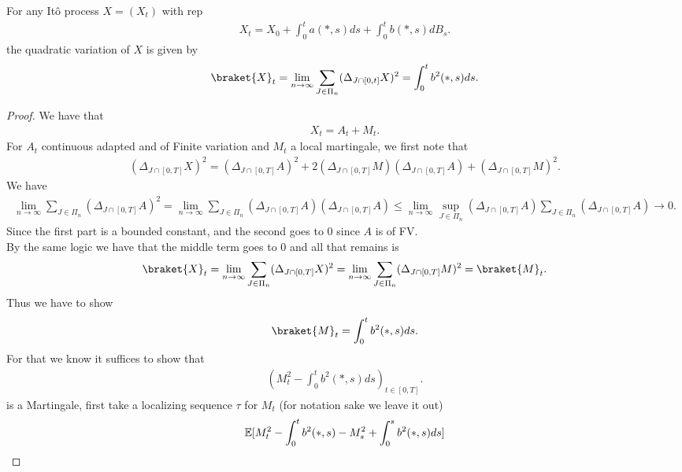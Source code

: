 \begin{Prop}[4.3]
  For any It\^o process $X = (X_t)$ with rep
  \begin{align*}
    X_t = X_{0} + \int_0^{t} a(*,s) ds + \int_0^{t} b(*,s) dB_s
  .\end{align*}
 the quadratic variation of $X$ is given by 
 \begin{align*}
   \braket{X}_t = \lim_{n\to \infty} \sum_{J \in  \Pi_n}(\Delta_{J \cap [0,t]} X)^2 = \int_0^{t} b^2(*,s)  ds
 .\end{align*}
\end{Prop}
\begin{proof}
 We have that 
 \begin{align*}
  X_t = A_t + M_t
 .\end{align*}
 For $A_t$ continuous adapted and of Finite variation and $M_t$ a local martingale,
 we first note that 
 \begin{align*}
  (\Delta_{J \cap [0,T]} X)^2 =   (\Delta_{J \cap [0,T]} A)^2 + 2(\Delta_{J \cap [0,T]} M)(\Delta_{J \cap [0,T]} A) + (\Delta_{J \cap [0,T]} M)^2
 .\end{align*}
 We have 
 \begin{align*}
   \lim_{n\to \infty}\sum_{J \in  \Pi_n} (\Delta_{J \cap [0,T]} A)^2  = \lim_{n\to \infty}\sum_{J \in  \Pi_n} (\Delta_{J \cap [0,T]} A) (\Delta_{J \cap [0,T]} A) \le  \lim_{n\to \infty}  \sup_{J \in  \Pi_n} (\Delta_{J \cap [0,T]} A) \sum_{J \in  \Pi_n} (\Delta_{J \cap [0,T]} A) \to 0
 .\end{align*}
 Since the first part is a bounded constant, and the second goes to 0 since $A$ is of FV.\\
 By the same logic we have that the middle term goes to 0 and all that remains is 
 \begin{align*}
   \braket{X}_t = \lim_{n\to \infty}\sum_{J \in  \Pi_n} (\Delta_{J \cap [0,T]} X)^2  = \lim_{n\to \infty}\sum_{J \in  \Pi_n} (\Delta_{J \cap [0,T]} M)^2 = \braket{M}_t
 .\end{align*}
Thus we have to show 
\begin{align*}
  \braket{M}_t =   \int_0^{t} b^2(*,s)  ds
.\end{align*}
For that we know it suffices to show that 
\begin{align*}
  (M_t^2 - \int_0^{t} b^2(*,s)  ds)_{t \in  [0,T]}
.\end{align*}
is a Martingale, first take a localizing sequence $\tau $ for $M_t$ (for notation sake we leave it out)
\begin{align*}
  &\E[M_t^2 - \int_0^{t} b^2(*,s)  -  M_s^2 + \int_0^{s} b^2(*,s) ds  ] \\

\end{align*}
\end{proof}
